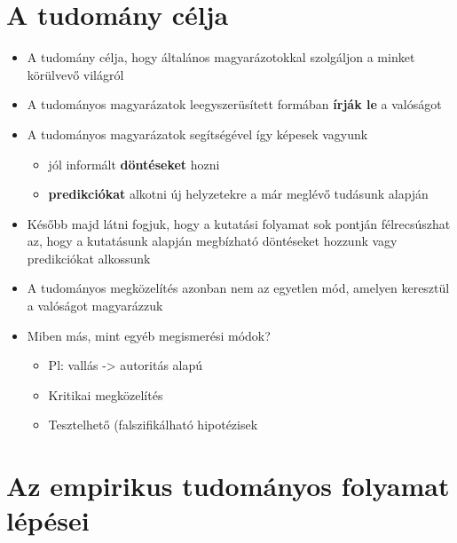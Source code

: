 \documentclass[
  letterpaper,
  DIV=11,
  numbers=noendperiod]{scrreprt}
\begin{document}
\hypertarget{a-tudomuxe1ny-cuxe9lja}{%
\section{A tudomány célja}\label{a-tudomuxe1ny-cuxe9lja}}

\begin{itemize}
\item
  A tudomány célja, hogy általános magyarázotokkal szolgáljon a minket
  körülvevő világról
\item
  A tudományos magyarázatok leegyszerüsített formában \textbf{írják le}
  a valóságot
\item
  A tudományos magyarázatok segítségével így képesek vagyunk

  \begin{itemize}
  \item
    jól informált \textbf{döntéseket} hozni
  \item
    \textbf{predikciókat} alkotni új helyzetekre a már meglévő tudásunk
    alapján
  \end{itemize}
\item
  Később majd látni fogjuk, hogy a kutatási folyamat sok pontján
  félrecsúszhat az, hogy a kutatásunk alapján megbízható döntéseket
  hozzunk vagy predikciókat alkossunk
\item
  A tudományos megközelítés azonban nem az egyetlen mód, amelyen
  keresztül a valóságot magyarázzuk
\item
  Miben más, mint egyéb megismerési módok?

  \begin{itemize}
  \item
    Pl: vallás -\textgreater{} autoritás alapú
  \item
    Kritikai megközelítés
  \item
    Tesztelhető (falszifikálható hipotézisek
  \end{itemize}
\end{itemize}

\hypertarget{az-empirikus-tudomuxe1nyos-folyamat-luxe9puxe9sei}{%
\section{Az empirikus tudományos folyamat
lépései}\label{az-empirikus-tudomuxe1nyos-folyamat-luxe9puxe9sei}}
\end{document}
